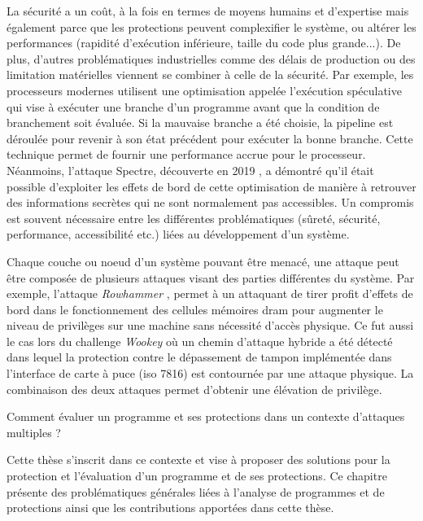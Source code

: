         La sécurité a un coût, à la fois en termes de moyens humains et d'expertise mais également parce que les protections peuvent complexifier le système, ou altérer les performances (rapidité d'exécution inférieure, taille du code plus grande...). De plus, d'autres problématiques industrielles comme des délais de production ou des limitation matérielles viennent se combiner à celle de la sécurité. 
        Par exemple, les processeurs modernes utilisent une optimisation appelée l'exécution spéculative qui vise à exécuter une branche d'un programme avant que la condition de branchement soit évaluée. Si la mauvaise branche a été choisie, la pipeline est déroulée pour revenir à son état précédent pour exécuter la bonne branche. Cette technique permet de fournir une performance accrue pour le processeur. Néanmoins, l'attaque Spectre, découverte en 2019 \cite{Kocher/SP2019}, a démontré qu'il était possible d'exploiter les effets de bord de cette optimisation de manière à retrouver des informations secrètes qui ne sont normalement pas accessibles. Un compromis est souvent nécessaire entre les différentes problématiques (sûreté, sécurité, performance, accessibilité etc.) liées au développement d'un système.
        
        Chaque couche ou noeud d'un système pouvant être menacé, une attaque peut être composée de plusieurs attaques visant des parties différentes du système. Par exemple, l'attaque \textit{Rowhammer} \cite{Kim/ACM14, Park/IIRW14}, permet à un attaquant de tirer profit d'effets de bord dans le fonctionnement des cellules mémoires \gls{dram} pour augmenter le niveau de privilèges sur une machine sans nécessité d'accès physique. 
        Ce fut aussi le cas lors du challenge \textit{Wookey} \cite{SSTIC20} où un chemin d'attaque hybride a été détecté dans lequel la protection contre le dépassement de tampon implémentée dans l'interface de carte à puce (\gls{iso} 7816) est contournée par une attaque physique. La combinaison des deux attaques permet d'obtenir une élévation de privilège. 
        
        \begin{probl}
        \label{prob:high-order-analysis}
            Comment évaluer un programme et ses protections dans un contexte d'attaques multiples ?
        \end{probl}
        
        Cette thèse s'inscrit dans ce contexte et vise à proposer des solutions pour la protection et l'évaluation d'un programme et de ses protections. Ce chapitre présente des problématiques générales liées à l'analyse de programmes et de protections ainsi que les contributions apportées dans cette thèse. 

